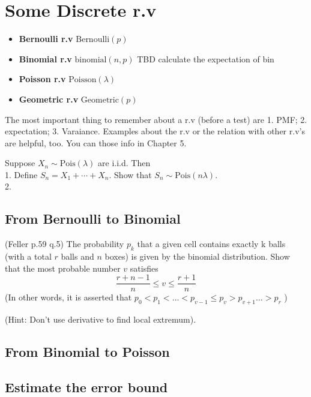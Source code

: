 \section{Some Discrete r.v}
\begin{itemize}
    \item \textbf{Bernoulli r.v} \(\text{Bernoulli}(p) \)  
    \item \textbf{Binomial r.v} \(\text{binomial}(n,p) \)   
    TBD calculate the expectation of bin
    \item \textbf{Poisson r.v} \(\text{Poisson}(\lambda )\) 
       
    \item \textbf{Geometric r.v} \(\text{Geometric}(p) \)  
\end{itemize}
The most important thing to remember about a r.v (before a test) are 1. PMF; 2. expectation; 3. Varaiance. Examples about the r.v or the relation with other r.v's are helpful, too. You can those info in \cite{Gravner2021} Chapter 5.\\

\begin{exercise}
    Suppose $X_n\sim\text{Pois}(\lambda)$ are i.i.d. Then\\
    1. Define $S_n=X_1+\cdots+X_n$. Show that $S_n\sim\text{Pois}(n\lambda)$.\\
    2. 
\end{exercise}

\subsection{From Bernoulli to Binomial}
\begin{exercise}
    (Feller p.59 q.5) The probability \(p_{k}\) that a given  cell contains exactly k balls (with a total \(r\) balls and \(n\) boxes) is given by the binomial distribution. 
    Show that the most probable number \(v\) satisfies 
    \[
        \frac{r+n-1}{n} \leq  v \leq \frac{r+1}{n}
    \]
    (In other words, it is asserted that \(p_0 < p_1 < \dots < p_{v-1} \leq p_{v} >  p_{v+1} \dots > p_r \) )
\end{exercise}
(Hint: Don't use derivative to find local extremum).

\subsection{From Binomial to Poisson}


\subsection{Estimate the error bound}


